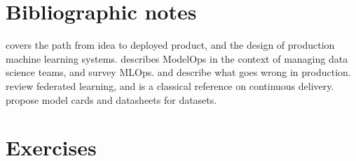 \section*{Bibliographic notes}

\citet{ameisen2020building} covers the path from idea to deployed product, and \citet{huyen2022designing} the
design of production machine learning systems. \citet{dubovikov2019managing} describes ModelOps in the context
of managing data science teams, and \citet{kreuzberger2023mlops} survey MLOps. \citet{sculley2015hidden} and
\citet{paleyes2022challenges} describe what goes wrong in production. \citet{kairouz2021advances}
review federated learning, and \citet{humble2010continuous} is a classical reference on continuous delivery. \citet{mitchell2019model} propose model cards and \citet{gebru2021datasheets}
datasheets for datasets.

\section*{Exercises}

